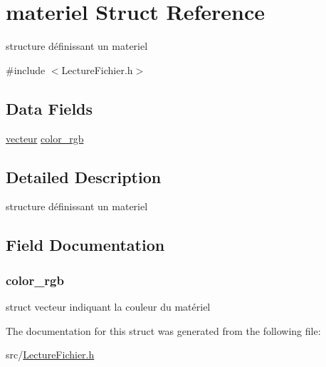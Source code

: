 \hypertarget{structmateriel}{
\section{materiel Struct Reference}
\label{structmateriel}
}


structure définissant un materiel  




{\ttfamily \#include $<$LectureFichier.h$>$}

\subsection*{Data Fields}
\begin{DoxyCompactItemize}
\item 
\hyperlink{structvecteur}{vecteur} \hyperlink{structmateriel_a9efa06c385522a41b30ea3767811650a}{color\_\-rgb}
\end{DoxyCompactItemize}


\subsection{Detailed Description}
structure définissant un materiel 

\subsection{Field Documentation}
\hypertarget{structmateriel_a9efa06c385522a41b30ea3767811650a}{
\subsubsection[{color\_\-rgb}]{ {\bf color\_\-rgb}}}
\label{structmateriel_a9efa06c385522a41b30ea3767811650a}
struct vecteur indiquant la couleur du matériel 

The documentation for this struct was generated from the following file:\begin{DoxyCompactItemize}
\item 
src/\hyperlink{_lecture_fichier_8h}{LectureFichier.h}\end{DoxyCompactItemize}
